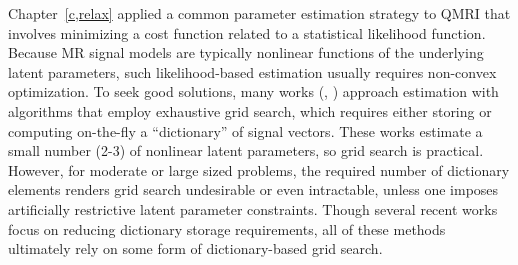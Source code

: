 Chapter~\ref{c,relax} applied
a common parameter estimation strategy to QMRI
that involves minimizing a cost function
related to a statistical likelihood function.
Because MR signal models are typically nonlinear functions
of the underlying latent parameters,
such likelihood-based estimation
usually requires non-convex optimization.
To seek good solutions,
many works
(\eg, 
\cite{%
	haldar:07:mle,%
	hernando:08:jeo,%
	barral:10:arm,%
	staroswiecki:12:seo,%
	ma:13:mrf,%
	trzasko:13:etf,%
	mcgivney:14:scf,%
	zhao:14:mbm,%
	beneliezer:15:raa,%
		zhao:15:amp,%
	cauley:15:fgm,%
	zhao:16:mlr,%
	nataraj:17:oms,%
	asslander::lra,%
	yang::lra%
})
approach estimation
with algorithms
that employ exhaustive grid search,
which requires either storing
or computing on-the-fly 
a ``dictionary'' of signal vectors.
These works estimate a small number (2-3)
of nonlinear latent parameters,
so grid search is practical.
However, 
for moderate or large sized problems,
the required number 
of dictionary elements
renders grid search undesirable or even intractable,
unless one imposes artificially restrictive latent parameter constraints.
Though several recent works
\cite{%
	mcgivney:14:scf,%
	cauley:15:fgm,%
	asslander::lra,%
	yang::lra%
}
focus on reducing dictionary storage requirements,
all of these methods ultimately rely 
on some form of dictionary-based grid search.

